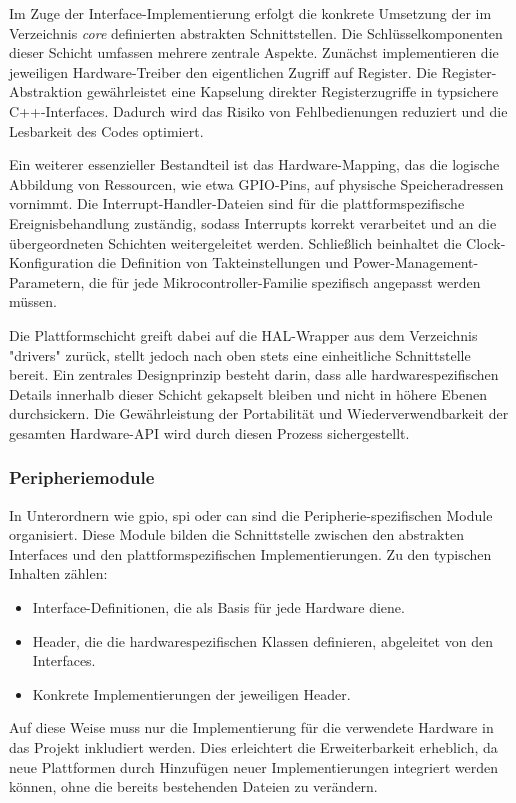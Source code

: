 Im Zuge der Interface-Implementierung erfolgt die konkrete Umsetzung der im Verzeichnis \textit{core} definierten abstrakten Schnittstellen. 
Die Schlüsselkomponenten dieser Schicht umfassen mehrere zentrale Aspekte. 
Zunächst implementieren die jeweiligen Hardware-Treiber den eigentlichen Zugriff auf Register.
Die Register-Abstraktion gewährleistet eine Kapselung direkter Registerzugriffe in typsichere C++-Interfaces. 
Dadurch wird das Risiko von Fehlbedienungen reduziert und die Lesbarkeit des Codes optimiert.

Ein weiterer essenzieller Bestandteil ist das Hardware-Mapping, das die logische Abbildung von Ressourcen, wie etwa GPIO-Pins, auf physische Speicheradressen vornimmt. 
Die Interrupt-Handler-Dateien sind für die plattformspezifische Ereignisbehandlung zuständig, sodass Interrupts korrekt verarbeitet und an die übergeordneten Schichten weitergeleitet werden. 
Schließlich beinhaltet die Clock-Konfiguration die Definition von Takteinstellungen und Power-Management-Parametern, die für jede Mikrocontroller-Familie spezifisch angepasst werden müssen.

Die Plattformschicht greift dabei auf die HAL-Wrapper aus dem Verzeichnis "drivers" zurück, stellt jedoch nach oben stets eine einheitliche Schnittstelle bereit. 
Ein zentrales Designprinzip besteht darin, dass alle hardwarespezifischen Details innerhalb dieser Schicht gekapselt bleiben und nicht in höhere Ebenen durchsickern. 
Die Gewährleistung der Portabilität und Wiederverwendbarkeit der gesamten Hardware-API wird durch diesen Prozess sichergestellt.

\subsubsection*{Peripheriemodule}
In Unterordnern wie gpio, spi oder can sind die Peripherie-spezifischen Module organisiert. 
Diese Module bilden die Schnittstelle zwischen den abstrakten Interfaces und den plattformspezifischen Implementierungen.
Zu den typischen Inhalten zählen:
\begin{itemize}
	\item Interface-Definitionen, die als Basis für jede Hardware diene.
	\item Header, die die hardwarespezifischen Klassen definieren, abgeleitet von den Interfaces.
	\item Konkrete Implementierungen der jeweiligen Header.
\end{itemize}

Auf diese Weise muss nur die Implementierung für die verwendete Hardware in das Projekt inkludiert werden.
Dies erleichtert die Erweiterbarkeit erheblich, da neue Plattformen durch Hinzufügen neuer Implementierungen integriert werden können, ohne die bereits bestehenden Dateien zu verändern.


